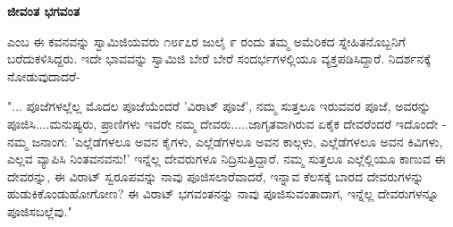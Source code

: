 \begin{myquote}
\end{myquote}

\begin{myquote}
\end{myquote}

\begin{myquote}
\end{myquote}

\begin{myquote}
\end{myquote}

\selectkan

\begin{center}
\textbf{ಜೀವಂತ ಭಗವಂತ}
\end{center}

 ಎಂಬ ಈ ಕವನವನ್ನು ಸ್ವಾಮಿಜಿಯವರು ೧೮೯೭ರ ಜುಲೈ ೯ ರಂದು ತಮ್ಮ ಅಮೆರಿಕದ ಸ್ನೇಹಿತನೊಬ್ಬನಿಗೆ ಬರೆದುಕಳಿಸಿದ್ದರು. ಇದೇ ಭಾವವನ್ನು ಸ್ವಾಮಿಜಿ ಬೇರೆ ಬೇರೆ ಸಂದರ್ಭಗಳಲ್ಲಿಯೂ ವ್ಯಕ್ತಪಡಿಸಿದ್ದಾರೆ. ನಿದರ್ಶನಕ್ಕೆ ನೋಡುವುದಾದರೆ-

"... ಪೂಜೆಗಳಲ್ಲೆಲ್ಲ ಮೊದಲ ಪೂಜೆಯೆಂದರೆ 'ವಿರಾಟ್ ಪೂಜೆ', ನಮ್ಮ ಸುತ್ತಲೂ ಇರುವವರ ಪೂಜೆ, ಅವರನ್ನು ಪೂಜಿಸಿ....ಮನುಷ್ಯರು, ಪ್ರಾಣಿಗಳು ಇವರೇ ನಮ್ಮ ದೇವರು.....ಜಾಗೃತವಾಗಿರುವ ಏಕೈಕ ದೇವರೆಂದರೆ ಇದೊಂದೇ - ನಮ್ಮ ಜನಾಂಗ: 'ಎಲ್ಲೆಡೆಗಳಲೂ ಅವನ ಕೈಗಳು, ಎಲ್ಲೆಡೆಗಳಲೂ ಅವನ ಕಾಲ್ಗಳು, ಎಲ್ಲೆಡೆಗಳಲೂ ಅವನ ಕಿವಿಗಳು, ಎಲ್ಲವ ವ್ಯಾಪಿಸಿ ನಿಂತವನವನು!' ಇನ್ನೆಲ್ಲ ದೇವರುಗಳೂ ನಿದ್ರಿಸುತ್ತಿದ್ದಾರೆ. ನಮ್ಮ ಸುತ್ತಲೂ ಎಲ್ಲೆಲ್ಲಿಯೂ ಕಾಣುವ ಈ ದೇವರನ್ನು, ಈ ವಿರಾಟ್ ಸ್ವರೂಪವನ್ನು ನಾವು ಪೂಜಿಸಲಾರೆವಾದರೆ, ಇನ್ನಾವ ಕೆಲಸಕ್ಕೆ ಬಾರದ ದೇವರುಗಳನ್ನು ಹುಡುಕಿಕೊಂಡುಹೋಗೋಣ? ಈ ವಿರಾಟ್ ಭಗವಂತನನ್ನು ನಾವು ಪೂಜಿಸುವಂತಾದಾಗ, ಇನ್ನೆಲ್ಲ ದೇವರುಗಳನ್ನೂ ಪೂಜಿಸಬಲ್ಲೆವು."

